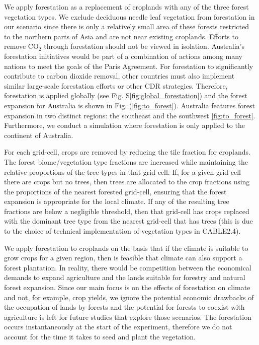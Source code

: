 \documentclass[]{article}
\begin{document}
We apply forestation as a replacement of croplands with any of the three forest vegetation types.
We exclude deciduous needle leaf vegetation from forestation in our scenario since there is only a relatively small area of these forests restricted to the northern parts of Asia and are not near existing croplands.
Efforts to remove CO$_2$ through forestation should not be viewed in isolation.
Australia's forestation initiatives would be part of a combination of actions among many nations to meet the goals of the Paris Agreement.
For forestation to significantly contribute to carbon dioxide removal, other countries must also implement similar large-scale forestation efforts or other CDR strategies.
Therefore, forestation is applied globally (see Fig.  S\ref{fig:global_forestation}) and the forest expansion for Australia is shown in Fig. (\ref{fig:to_forest}).
Australia features forest expansion in two distinct regions: the southeast and the southwest \ref{fig:to_forest}.
Furthermore, we conduct a simulation where forestation is only applied to the continent of Australia.

For each grid-cell, crops are removed by reducing the tile fraction for croplands.
The forest biome/vegetation type fractions are increased while maintaining the relative proportions of the tree types in that grid cell.
If, for a given grid-cell there are crops but no trees, then trees are allocated to the crop fractions using the proportions of the nearest forested grid-cell, ensuring that the forest expansion is appropriate for the local climate.
If any of the resulting tree fractions are below a negligible threshold, then that grid-cell has crops replaced with the dominant tree type from the nearest grid-cell that has trees (this is due to the choice of technical implementation of vegetation types in CABLE2.4).

We apply forestation to croplands on the basis that if the climate is suitable to grow crops for a given region, then is feasible that climate can also support a forest plantation.
In reality, there would be competition between the economical demands to expand agriculture and the lands suitable for forestry and natural forest expansion.
Since our main focus is on the effects of forestation on climate and not, for example, crop yields, we ignore the potential economic drawbacks of the occupation of lands by forests and the potential for forests to coexist with agriculture is left for future studies that explore those scenarios.
The forestation occurs instantaneously at the start of the experiment, therefore we do not account for the time it takes to seed and plant the vegetation.
\end{document}
